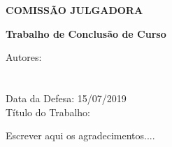 \documentclass[
	12pt,				%
	openright,			%
	oneside,			%
	a4paper,			%
	chapter=TITLE,		%
	english,			%
	brazil				%
	]{abntex2}
\begin{document}

%
% 
%
\begin{folhadeaprovacao}

  \begin{center}
    {\ABNTEXchapterfont\bfseries\large COMISSÃO JULGADORA}

    \vspace*{\fill}\vspace*{\fill}
    \begin{center}
      {\ABNTEXchapterfont\bfseries\large Trabalho de Conclusão de Curso}
    \end{center}
    \vspace*{\fill}      
    \vspace*{\fill}
   \end{center}
        
   \noindent Autores:\\ \imprimirautor\\
   \\Data da Defesa: 15/07/2019\\
   Título do Trabalho: \imprimirtitulo
   
   \vspace*{\fill}      
   \vspace*{\fill}

     
   \vspace*{\fill}      
   \vspace*{\fill}  
     
\end{folhadeaprovacao}


\begin{agradecimentos}
Escrever aqui os agradecimentos....
\end{agradecimentos}
\end{document}
